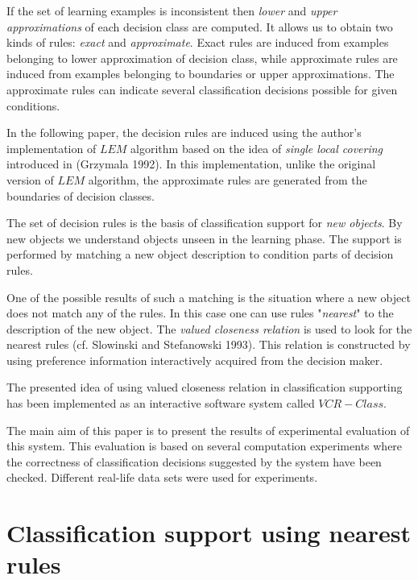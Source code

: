 If the set of learning examples  is  inconsistent  then {\it lower}
and {\it upper  approximations}  of  each   decision   class    are
computed. It allows us to obtain two kinds  of  rules:
{\it exact}  and {\it approximate}. Exact rules are  induced   from
examples  belonging  to  lower  approximation  of  decision  class,
while approximate rules  are induced  from    examples    belonging
to   boundaries   or   upper  approximations.   The  approximate
rules  can  indicate   several  classification  decisions  possible
for given conditions.

In the following paper, the decision rules are  induced  using  the
author's implementation of $LEM$ algorithm based on  the  idea   of
{\it  single  local   covering}   introduced  in  (Grzymala 1992).
In  this   implementation,   unlike   the   original
version   of   $LEM$ algorithm, the approximate rules are generated
from the  boundaries of decision classes.

The set of decision rules is the basis  of  classification  support
for {\it new objects}. By new objects we understand objects  unseen
in the learning phase. The support is performed by matching a   new
object description to condition parts of decision rules.

One of the possible results of such  a  matching  is  the   situation
where a new object does not match  any  of  the   rules.   In    this
case  one   can  use rules "{\it nearest}" to the description of  the
new object.  The {\it valued   closeness   relation}   is   used   to
look   for  the  nearest rules  (cf.  Slowinski and Stefanowski 1993).
This relation is constructed  by  using    preference    information
interactively acquired from the decision maker.

The  presented  idea  of  using  valued  closeness    relation   in
classification supporting  has been implemented as an   interactive
software  system called $VCR-Class$.

The  main  aim  of  this  paper  is  to  present  the  results   of
experimental evaluation of  this   system.   This   evaluation   is
based  on  several computation experiments  where  the  correctness
of  classification decisions   suggested   by   the   system   have
been  checked.   Different  real-life  data  sets   were  used  for
experiments.

\section{Classification support using nearest rules}

